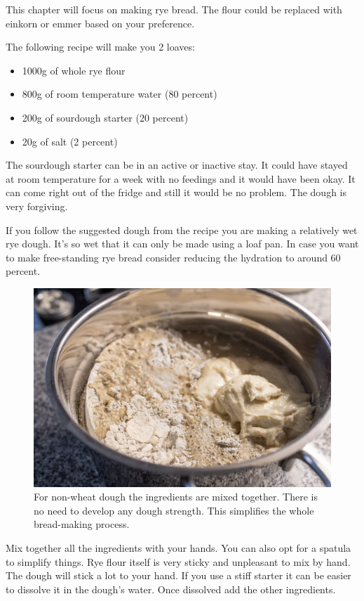 This chapter will focus on making rye bread. The flour could
be replaced with einkorn or emmer based on your preference.

The following recipe will make you 2 loaves:
\begin{itemize}
  \item 1000g of whole rye flour
  \item 800g of room temperature water (80 percent)
  \item 200g of sourdough starter (20 percent)
  \item 20g of salt (2 percent)
\end{itemize}

The sourdough starter can be in an active or inactive stay. It could have
stayed at room temperature for a week with no feedings and it would
have been okay. It can come right out of the fridge and still it would
be no problem. The dough is very forgiving.

If you follow the suggested dough from the recipe you are making a relatively
wet rye dough. It's so wet that it can only be made using a loaf pan. In case
you want to make free-standing rye bread consider reducing the hydration
to around 60 percent.

\begin{figure}[!htb]
  \includegraphics[width=\textwidth]{ingredients}
  \caption{For non-wheat dough the ingredients are mixed together. There is no need
  to develop any dough strength. This simplifies the whole bread-making process.}
  \label{fig:non-wheat-ingredients}
\end{figure}

Mix together all the ingredients with your hands. You can also
opt for a spatula to simplify things. Rye flour itself is very
sticky and unpleasant to mix by hand. The dough will stick
a lot to your hand. If you use a stiff starter it can be
easier to dissolve it in the dough's water. Once dissolved
add the other ingredients.


